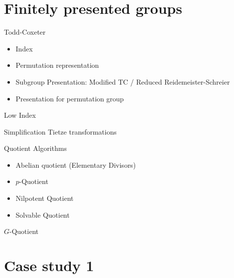 \documentclass{article}
\newcommand{\entrylabel}[1]{\mbox{#1}\hfil}
\def\Abschnitt#1{\section*{{\huge\bf #1}}}
\newenvironment{entry}
{\begin{list}{}%
{\renewcommand{\makelabel}{\entrylabel}%
\setlength{\labelwidth}{45mm}%
\setlength{\leftmargin}{50mm}%
}%
}%
{\end{list}}
\begin{document}
\Abschnitt{Finitely presented groups}
\noindent
\begin{entry}
\item[Todd-Coxeter]
\begin{itemize}
\item Index
\item Permutation representation
\item Subgroup Presentation: Modified TC / \quad Reduced Reidemeister-Schreier
\item Presentation for permutation group
\end{itemize}
\item[Low Index]
\item[Simplification] Tietze transformations
\item[Quotient Algorithms]
\begin{itemize}
\item Abelian quotient (Elementary Divisors)
\item $p$-Quotient
\item Nilpotent Quotient
\item Solvable Quotient
\end{itemize}
\item[$G$-Quotient]
\end{entry}

\newpage\noindent
\Abschnitt{Case study 1}
\end{document}
